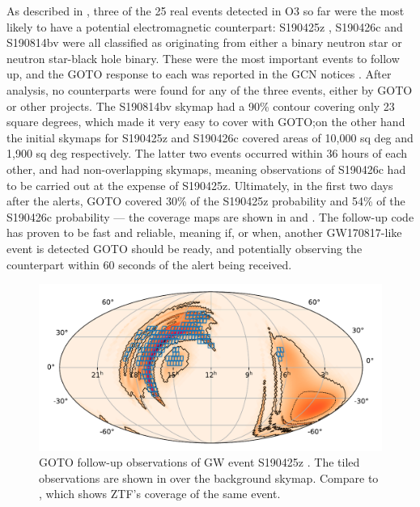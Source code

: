 \begin{colsection}
As described in , three of the 25 real events detected in O3 so far were the most likely to have a potential electromagnetic counterpart: S190425z \citep{S190425z}, S190426c \citep{S190426c} and S190814bv \citep{S190814bv} were all classified as originating from either a binary neutron star or neutron star-black hole binary. These were the most important events to follow up, and the GOTO response to each was reported in the GCN notices \citet{S190425z_GOTO, S190426c_GOTO, S190814bv_GOTO}. After analysis, no counterparts were found for any of the three events, either by GOTO or other projects. The S190814bv skymap had a 90\% contour covering only 23 square degrees, which made it very easy to cover with GOTO;\@ on the other hand the initial skymaps for S190425z and S190426c covered areas of 10,000 sq deg and 1,900 sq deg respectively. The latter two events occurred within 36 hours of each other, and had non-overlapping skymaps, meaning observations of S190426c had to be carried out at the expense of S190425z. Ultimately, in the first two days after the alerts, GOTO covered 30\% of the S190425z probability \citep{S190425z_GOTO} and 54\% of the S190426c probability \citep{S190426c_GOTO} --- the coverage maps are shown in  and . The follow-up code has proven to be fast and reliable, meaning if, or when, another GW170817-like event is detected GOTO should be ready, and potentially observing the counterpart within 60 seconds of the alert being received.

\begin{figure}[p]
    \begin{center}
        \includegraphics[width=0.9\linewidth]{images/190425_goto.pdf}
    \end{center}
    \caption[Follow-up observations of S190425z with GOTO]{
        GOTO follow-up observations of GW event S190425z \citep{S190425z_GOTO}. The tiled observations are shown in  over the background skymap. Compare to , which shows ZTF's coverage of the same event.
        }\label{fig:190425_goto}
\end{figure}


\end{colsection}
